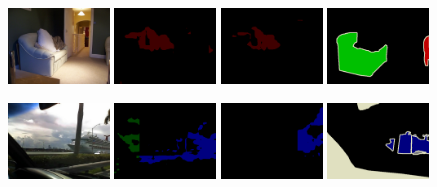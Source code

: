 \begin{figure}[t]
  {\includegraphics[width=0.24\textwidth]{figures/experiments/pascal/0010.jpg}}
  {\includegraphics[width=0.24\textwidth]{figures/experiments/pascal/orgckpt/0010.png}}
  {\includegraphics[width=0.24\textwidth]{figures/experiments/pascal/ft/0010.png}}
  {\includegraphics[width=0.24\textwidth]{figures/experiments/pascal/gt/2007_000452.png}}
  
  {\includegraphics[width=0.24\textwidth]{figures/experiments/pascal/0013.jpg}}
  {\includegraphics[width=0.24\textwidth]{figures/experiments/pascal/orgckpt/0013.png}}
  {\includegraphics[width=0.24\textwidth]{figures/experiments/pascal/ft/0013.png}}
  {\includegraphics[width=0.24\textwidth]{figures/experiments/pascal/gt/2007_000529.png}}


\end{figure}
